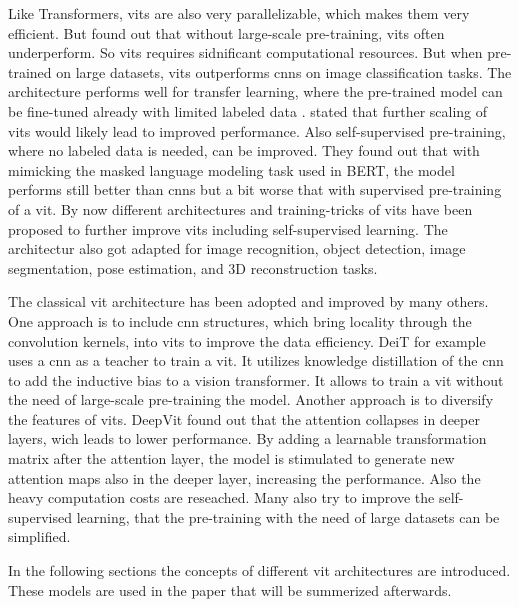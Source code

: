 \documentclass[conference]{IEEEtran}
\begin{document}
  Like Transformers, \acp{vit} are also very parallelizable, which makes them very efficient. But \cite{visiontransformers2021} found out that without large-scale pre-training, \acp{vit} often underperform. So \acp{vit} requires sidnificant computational resources. But when pre-trained on large datasets, \acp{vit} outperforms \acp{cnn} on image classification tasks. The architecture performs well for transfer learning, where the pre-trained model can be fine-tuned already with limited labeled data \cite{visiontransformers2021}.  \cite{visiontransformers2021} stated that further scaling of \acp{vit} would likely lead to improved performance. Also self-supervised pre-training, where no labeled data is needed, can be improved. They found out that with mimicking the masked language modeling task used in BERT, the model performs still better than \acp{cnn} but a bit worse that with supervised pre-training of a \ac{vit}. By now different architectures and training-tricks of \acp{vit} have been proposed to further improve \acp{vit} including self-supervised learning. The architectur also got adapted for image recognition, object detection, image segmentation, pose estimation, and 3D reconstruction tasks. \cite{vit-state-challenges}

  The classical \ac{vit} architecture has been adopted and improved by many others. One approach is to include \ac{cnn} structures, which bring locality through the convolution kernels, into \acp{vit} to improve the data efficiency. DeiT \cite{deit} for example uses a \ac{cnn} as a teacher to train a \ac{vit}. It utilizes knowledge distillation of the \ac{cnn} to add the inductive bias to a vision transformer. It allows to train a \ac{vit} without the need of large-scale pre-training the model. \cite{vit-state-challenges} Another approach is to diversify the features of \acp{vit}. DeepVit \cite{deepvit} found out that the attention collapses in deeper layers, wich leads to lower performance. By adding a learnable transformation matrix after the attention layer, the model is stimulated to generate new attention maps also in the deeper layer, increasing the performance. \cite{vit-state-challenges} Also the heavy computation costs are reseached. Many also try to improve the self-supervised learning, that the pre-training with the need of large datasets can be simplified. \cite{vit-state-challenges}
  
  In the following sections the concepts of different \ac{vit} architectures are introduced. These models are used in the paper \cite{registers} that will be summerized afterwards.
\end{document}
